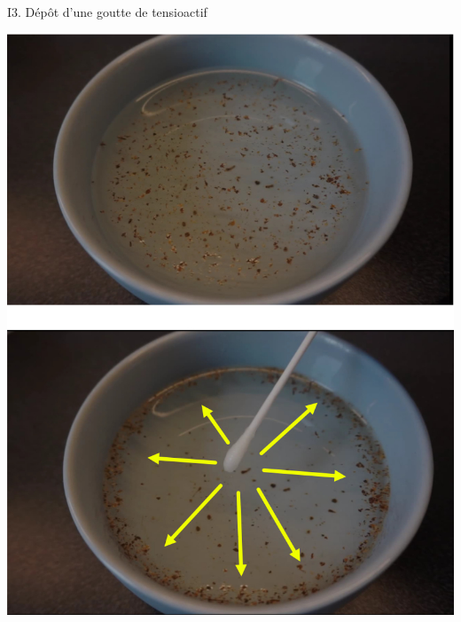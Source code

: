\documentclass[aspectratio=169,10pt]{beamer}
\begin{document}

  \begin{frame}{I3. Dépôt d'une goutte de tensioactif}
    \begin{minipage}{.4\textwidth}
      \centering
      \resizebox{!}{.8\textwidth}{}
    \end{minipage}\hfill
    \begin{minipage}{.5\textwidth}
      \centering
      \includegraphics[width=.6\textwidth]{./figures/Distanciation_v3.jpg}
    \end{minipage}
  \end{frame}
\end{document}
